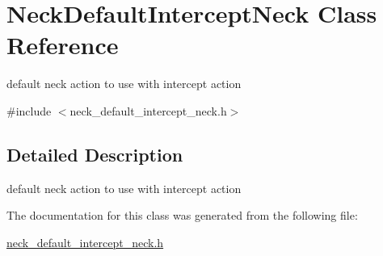 \hypertarget{classNeckDefaultInterceptNeck}{
\section{NeckDefaultInterceptNeck Class Reference}
\label{classNeckDefaultInterceptNeck}
}


default neck action to use with intercept action  




{\ttfamily \#include $<$neck\_\-default\_\-intercept\_\-neck.h$>$}



\subsection{Detailed Description}
default neck action to use with intercept action 

The documentation for this class was generated from the following file:\begin{DoxyCompactItemize}
\item 
\hyperlink{neck__default__intercept__neck_8h}{neck\_\-default\_\-intercept\_\-neck.h}\end{DoxyCompactItemize}
